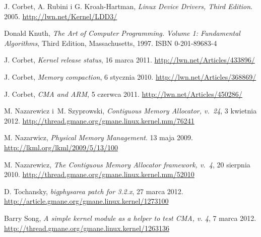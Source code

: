 \begin{thebibliography}{99}

  J. Corbet, A. Rubini i G. Kroah-Hartman,
  \emph{Linux Device Drivers, Third Edition}.
  2005.
  \url{http://lwn.net/Kernel/LDD3/}

  Donald Knuth,
  \emph{The Art of Computer Programming. Volume 1: Fundamental
    Algorithms},
  Third Edition,
  Massachusetts, 1997.
  ISBN 0-201-89683-4

  J. Corbet,
  \emph{Kernel release status},
  16 marca 2011.
  \url{http://lwn.net/Articles/433896/}

  J. Corbet,
  \emph{Memory compaction},
  6 stycznia 2010.
  \url{http://lwn.net/Articles/368869/}

  J. Corbet,
  \emph{CMA and ARM},
  5 czerwca 2011.
  \url{http://lwn.net/Articles/450286/}

  M. Nazarewicz i~M. Szyprowski,
  \emph{Contiguous Memory Allocator, v.\ 24},
  3 kwietnia 2012.
  \url{http://thread.gmane.org/gmane.linux.kernel.mm/76241}

  M. Nazarwicz,
  \emph{Physical Memory Management}.
  13 maja 2009.
  \url{http://lkml.org/lkml/2009/5/13/100}

  M. Nazarewicz,
  \emph{The Contiguous Memory Allocator framework, v.\ 4},
  20 sierpnia 2010.
  \url{http://thread.gmane.org/gmane.linux.kernel.mm/52010}

  D. Tochansky,
  \emph{bigphysarea patch for 3.2.x},
  27 marca 2012.
  \url{http://article.gmane.org/gmane.linux.kernel/1273100}

  Barry Song,
  \emph{A simple kernel module as a helper to test CMA, v. 4},
  7 marca 2012.
  \url{http://thread.gmane.org/gmane.linux.kernel/1263136}


\end{thebibliography}
